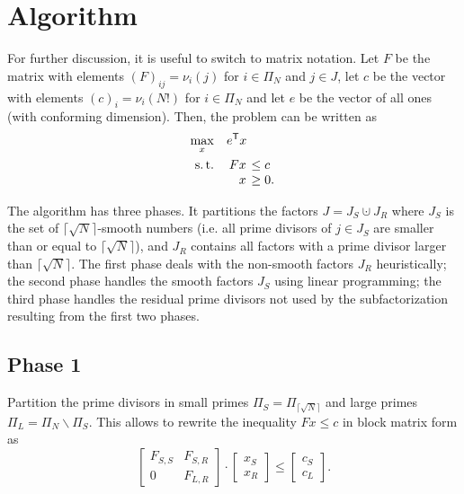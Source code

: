 \documentclass[12pt,a4paper,reqno]{amsart}
\numberwithin{equation}{section}
\begin{document}
\section{Algorithm}

For further discussion, it is useful to switch to matrix notation. Let $F$ be
the matrix with elements $(F)_{ij} = \nu_i(j)$ for $i \in \Pi_N$ and $j \in
J$, let $c$ be the vector with elements $(c)_i = \nu_i(N!)$ for $i \in
\Pi_N$ and let $e$ be the vector of all ones (with conforming dimension).
Then, the problem can be written as
\begin{equation}
\label{eq:lp_full}
  \begin{aligned}
    \max_x          \quad & e^\mathsf{T} x \\
    \mathrm{s.\,t.} \quad & \arraycolsep2pt\begin{array}[t]{rl}
                                F x & \leq c \\
                                  x & \geq 0.
                            \end{array}
  \end{aligned}
\end{equation}

The algorithm has three phases. It partitions the factors $J = J_S \cupdot J_R$
where $J_S$ is the set of $\lceil \sqrt{N} \rceil$-smooth numbers (i.e. all
prime divisors of $j \in J_S$ are smaller than or equal to $\lceil \sqrt{N}
\rceil$), and $J_R$ contains all factors with a prime divisor larger than
$\lceil \sqrt{N} \rceil$. The first phase deals with the non-smooth factors
$J_R$ heuristically; the second phase handles the smooth factors $J_S$ using
linear programming; the third phase handles the residual prime divisors not
used by the subfactorization resulting from the first two phases.

\subsection*{Phase 1}

Partition the prime divisors in small primes $\Pi_S = \Pi_{\lceil \sqrt{N}
\rceil}$ and large primes $\Pi_{L} = \Pi_N \backslash \Pi_S$. This allows to
rewrite the inequality $Fx \leq c$ in block matrix form as
\begin{equation*}
  \begin{bmatrix}
    F_{S,S} & F_{S,R} \\
      0    & F_{L,R}
  \end{bmatrix}
  \cdot
  \begin{bmatrix} x_S \\ x_R \end{bmatrix}
  \leq
  \begin{bmatrix} c_S \\ c_L \end{bmatrix}.
\end{equation*}
\end{document}
